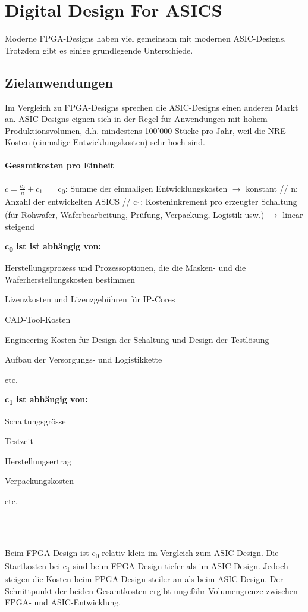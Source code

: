 \section{Digital Design For ASICS}
Moderne FPGA-Designs haben viel gemeinsam mit modernen ASIC-Designs. Trotzdem gibt es einige grundlegende Unterschiede.
\subsection{Zielanwendungen}
Im Vergleich zu FPGA-Designs sprechen die ASIC-Designs einen anderen Markt an. ASIC-Designs eignen sich in der Regel für Anwendungen mit hohem Produktionsvolumen, d.h. mindestens 100'000 Stücke pro Jahr, weil die NRE Kosten (einmalige Entwicklungskosten) sehr hoch sind. 
\paragraph{Gesamtkosten pro Einheit} 
$c=\frac{c_0}{n}+c_1$ \ \ \ c\textsubscript{0}: Summe der einmaligen Entwicklungskosten $\rightarrow$ konstant // n: Anzahl der entwickelten ASICS // c\textsubscript{1}: Kosteninkrement pro erzeugter Schaltung (für Rohwafer, Waferbearbeitung, Prüfung, Verpackung, Logistik usw.) $\rightarrow$ linear steigend
\begin{multicols}{2}
\textbf{c\textsubscript{0} ist ist abhängig von:} 
\begin{compactitem}
    \item Herstellungsprozess und Prozessoptionen, die die Masken- und die Waferherstellungskosten bestimmen
    \item Lizenzkosten und Lizenzgebühren für IP-Cores
    \item CAD-Tool-Kosten
    \item Engineering-Kosten für Design der Schaltung und Design der Testlösung
    \item Aufbau der Versorgungs- und Logistikkette
    \item etc.
\end{compactitem}
\textbf{c\textsubscript{1} ist abhängig von:} 
\begin{compactitem}
    \item Schaltungsgrösse
    \item Testzeit
    \item Herstellungsertrag
    \item Verpackungskosten
    \item etc.
\end{compactitem}
\ \\ \ \\
\end{multicols}
Beim FPGA-Design ist c\textsubscript{0} relativ klein im Vergleich zum ASIC-Design. Die Startkosten bei c\textsubscript{1} sind beim FPGA-Design tiefer als im ASIC-Design. Jedoch steigen die Kosten beim FPGA-Design steiler an als beim ASIC-Design. Der Schnittpunkt der beiden Gesamtkosten ergibt ungefähr Volumengrenze zwischen FPGA- und ASIC-Entwicklung. 
